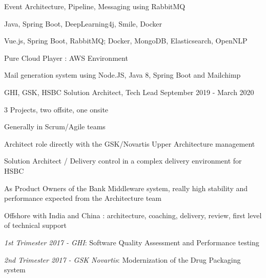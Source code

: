 \begin{cventries}
{{            }
            {
                \begin{cvitems} %
                    \item{Event Architecture, Pipeline, Messaging using RabbitMQ}
                    \item{Java, Spring Boot, DeepLearning4j, Smile, Docker}
                    \item{Vue.js, Spring Boot, RabbitMQ; Docker, MongoDB, Elasticsearch, OpenNLP}
                    \item{Pure Cloud Player : AWS Environment}
                    \item{Mail generation system using Node.JS, Java 8, Spring Boot and Mailchimp}
                \end{cvitems}
            }
        }
        \cventry
        {} %
        {} %
        {} %
        {} %
        {
            \globalexperience
            {GHI, GSK, HSBC} %
            {Solution Architect, Tech Lead} %
            {September 2019 - March 2020} %
            {
                \begin{cvitems} %
                    \item{3 Projects, two offsite, one onsite}
                    \item{Generally in Scrum/Agile teams}
                    \item{Architect role directly with the GSK/Novartis Upper Architecture management}
                    \item{Solution Architect / Delivery control in a complex delivery environment for HSBC}
                    \item{As Product Owners of the Bank Middleware system, really high stability and performance expected from the Architecture team}
                    \item{Offshore with India and China : architecture, coaching, delivery, review, first level of technical support}
                \end{cvitems}
            }
            {
                \begin{cvitems} %
                \item{ \emph{1st Trimester 2017 - GHI}: Software Quality Assessment and Performance testing}
                \item{ \emph{2nd Trimester 2017 - GSK Novartis}: Modernization of the Drug Packaging system}

\end{cvitems}}}
\end{cventries}
